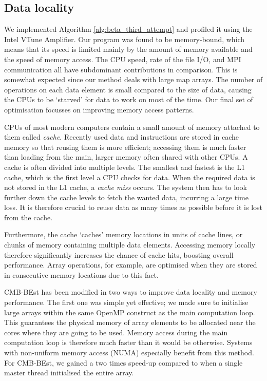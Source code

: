 \subsection{Data locality}

We implemented Algorithm \ref{alg:beta_third_attempt} and profiled it using the Intel VTune Amplifier. Our program was found to be memory-bound, which means that its speed is limited mainly by the amount of memory available and the speed of memory access. The CPU speed, rate of the file I/O, and MPI communication all have subdominant contributions in comparison. This is somewhat expected since our method deals with large map arrays. The number of operations on each data element is small compared to the size of data, causing the CPUs to be `starved' for data to work on most of the time. Our final set of optimisation focusses on improving memory access patterns.

CPUs of most modern computers contain a small amount of memory attached to them called \textit{cache}. Recently used data and instructions are stored in cache memory so that reusing them is more efficient; accessing them is much faster than loading from the main, larger memory often shared with other CPUs. A cache is often divided into multiple levels. The smallest and fastest is the L1 cache, which is the first level a CPU checks for data. When the required data is not stored in the L1 cache, a \textit{cache miss} occurs. The system then has to look further down the cache levels to fetch the wanted data, incurring a large time loss. It is therefore crucial to reuse data as many times as possible before it is lost from the cache.

Furthermore, the cache `caches' memory locations in units of cache lines, or chunks of memory containing multiple data elements. Accessing memory locally therefore significantly increases the chance of cache hits, boosting overall performance. Array operations, for example, are optimised when they are stored in consecutive memory locations due to this fact.

CMB-BEst has been modified in two ways to improve data locality and memory performance. The first one was simple yet effective; we made sure to initialise large arrays within the same OpenMP construct as the main computation loop. This guarantees the physical memory of array elements to be allocated near the cores where they are going to be used. Memory access during the main computation loop is therefore much faster than it would be otherwise. Systems with non-uniform memory access (NUMA) especially benefit from this method. For CMB-BEst, we gained a two times speed-up compared to when a single master thread initialised the entire array.

